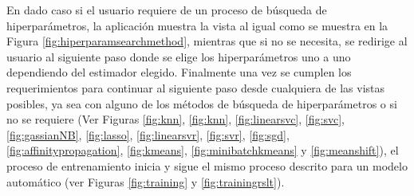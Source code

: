 En dado caso si el usuario requiere de un proceso de búsqueda de hiperparámetros, la aplicación muestra la vista al igual como se muestra en la Figura \ref{fig:hiperparamsearchmethod}, mientras que si no se necesita, se redirige al usuario al siguiente paso donde se elige los hiperparámetros uno a uno dependiendo del estimador elegido. Finalmente una vez se cumplen los requerimientos para continuar al siguiente paso desde cualquiera de las vistas posibles, ya sea con alguno de los métodos de búsqueda de hiperparámetros o si no se requiere (Ver Figuras \ref{fig:knn}, \ref{fig:knn}, \ref{fig:linearsvc}, \ref{fig:svc}, \ref{fig:gassianNB}, \ref{fig:lasso}, \ref{fig:linearsvr}, \ref{fig:svr}, \ref{fig:sgd}, \ref{fig:affinitypropagation}, \ref{fig:kmeans}, \ref{fig:minibatchkmeans} y \ref{fig:meanshift}), el proceso de entrenamiento inicia y sigue el mismo proceso descrito para un modelo automático (ver Figuras \ref{fig:training} y \ref{fig:trainingrslt}).
